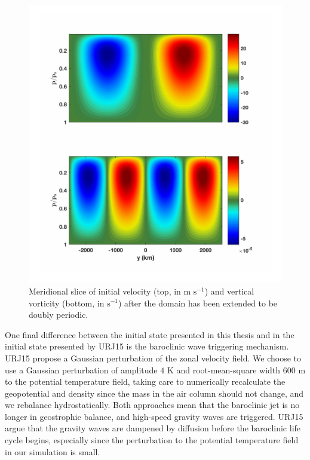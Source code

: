 \begin{figure}[H]
\includegraphics[scale=1]{Chapter3/img/initialVelVortDouble}
\caption{Meridional slice of initial velocity (top, in $\text{m s}^{-1}$) and vertical vorticity (bottom, in $\text{s}^{-1}$) after the domain has been extended to be doubly periodic.}
\label{fig:initialVelVortDouble}
\end{figure}
One final difference between the initial state presented in this thesis and in the initial state presented by URJ15 is the baroclinic wave triggering mechanism. URJ15 propose a Gaussian perturbation of the zonal velocity field. We choose to use a Gaussian perturbation of amplitude $4$ K  and root-mean-square width $600$ m to the potential temperature field, taking care to numerically recalculate the geopotential and density since the mass in the air column should not change, and we rebalance hydrostatically. Both approaches mean that the baroclinic jet is no longer in geostrophic balance, and high-speed gravity waves are triggered. URJ15 argue that the gravity waves are dampened by diffusion before the baroclinic life cycle begins, especially since the perturbation to the potential temperature field in our simulation is small.

